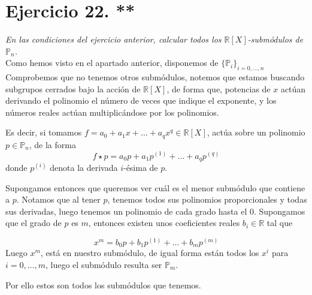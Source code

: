 \section{Ejercicio 22. **} \textit{En las condiciones del ejercicio anterior, calcular
  todos los \(\mathbb{R}[X]\)-submódulos de \(\mathbb{P}_n\).}\\

Como hemos visto en el apartado anterior, disponemos de \(\{\mathbb{P}_i\}_{i=0,\dots,n}\)
Comprobemos que no tenemos otros submódulos, notemos que estamos buscando
subgrupos cerrados bajo la acción de \(\mathbb{R}[X]\), de forma que, potencias
de \(x\) actúan derivando el polinomio el número de veces que indique el
exponente, y los números reales actúan multiplicándose por los polinomios.

Es decir, si tomamos \(f = a_0 + a_1x + \dots + a_qx^q \in \mathbb{R}[X]\), actúa
sobre un polinomio \(p \in \mathbb{P}_n\), de la forma
\[
  f \star p = a_0p + a_1p^{(1)} + \dots + a_qp^{(q)}
\]
donde \(p^{(i)}\) denota la derivada \(i\)-ésima de \(p\).

Supongamos entonces que queremos ver cuál es el menor submódulo que contiene a
\(p\).  Notamos que al tener \(p\), tenemos todos sus polinomios proporcionales
y todas sus derivadas, luego tenemos un polinomio de cada grado hasta el 0.
Supongamos que el grado de \(p\) es \(m\), entonces existen unos coeficientes
reales \(b_i \in \mathbb{R}\) tal que

\[
  x^m = b_0p + b_1p^{(1)}+ \dots + b_mp^{(m)}
\]
Luego \(x^m\), está en nuestro submódulo, de igual forma están todos los \(x^i\)
para \(i = 0,\dots,m\), luego el submódulo resulta ser \(\mathbb{P}_m\).

Por ello estos son todos los submódulos que tenemos.
